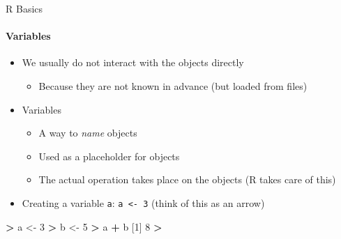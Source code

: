 \documentclass[ignorenonframetext,]{beamer}
\newenvironment{Shaded}{\begin{snugshade}}{\end{snugshade}}
\newcommand{\DecValTok}[1]{\textcolor[rgb]{0.00,0.00,0.81}{#1}}
\newcommand{\NormalTok}[1]{#1}
\newcommand{\OperatorTok}[1]{\textcolor[rgb]{0.81,0.36,0.00}{\textbf{#1}}}
\newcommand{\StringTok}[1]{\textcolor[rgb]{0.31,0.60,0.02}{#1}}
\providecommand{\tightlist}{%
  \setlength{\itemsep}{0pt}\setlength{\parskip}{0pt}}
\begin{document}
\begin{frame}[fragile]{R Basics}
\protect\hypertarget{r-basics-4}{}

\framesubtitle{Variables}

\begin{itemize}
\tightlist
\item
  We usually do not interact with the objects directly

  \begin{itemize}
  \tightlist
  \item
    Because they are not known in advance (but loaded from files)
  \end{itemize}
\item
  Variables

  \begin{itemize}
  \tightlist
  \item
    A way to \emph{name} objects
  \item
    Used as a placeholder for objects
  \item
    The actual operation takes place on the objects (R takes care of
    this)
  \end{itemize}
\item
  Creating a variable \texttt{a}: \texttt{a\ \textless{}-\ 3} (think of
  this as an arrow)
\end{itemize}

\begin{Shaded}
\begin{Highlighting}[]
\OperatorTok{>}\StringTok{ }\NormalTok{a <-}\StringTok{ }\DecValTok{3}
\OperatorTok{>}\StringTok{ }\NormalTok{b <-}\StringTok{ }\DecValTok{5}
\OperatorTok{>}\StringTok{ }\NormalTok{a }\OperatorTok{+}\StringTok{ }\NormalTok{b}
\NormalTok{[}\DecValTok{1}\NormalTok{] }\DecValTok{8}
\OperatorTok{>}
\end{Highlighting}
\end{Shaded}

\end{frame}
\end{document}
